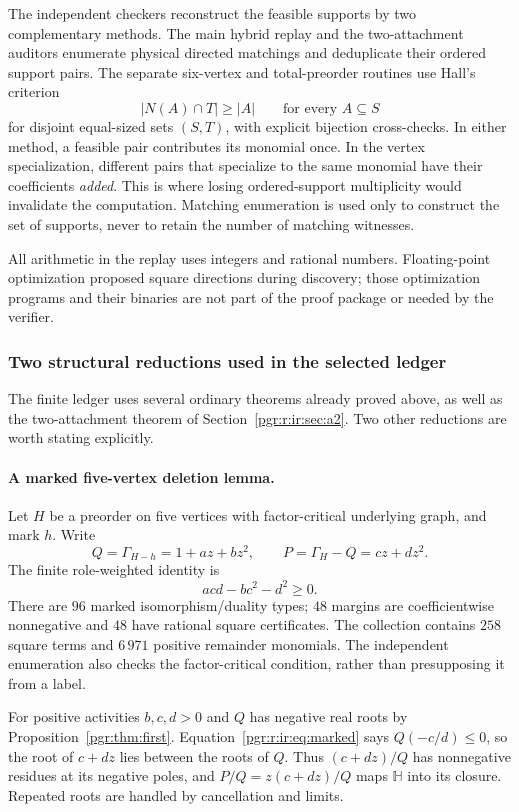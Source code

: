 \documentclass[11pt]{article}
\numberwithin{equation}{section}
\theoremstyle{definition}\newtheorem{definition}[theorem]{Definition}\newtheorem{remark}[theorem]{Remark}
\newcommand{\Ga}{\Gamma}                   %
\newcommand{\HH}{\mathbb H}                %
\begin{document}
The independent checkers reconstruct the feasible supports by two complementary methods. The main hybrid replay and the two-attachment auditors enumerate physical directed matchings and deduplicate their ordered support pairs. The separate six-vertex and total-preorder routines use Hall's criterion
\[
 |N(A)\cap T|\ge |A|\qquad\text{for every }A\subseteq S
\]
for disjoint equal-sized sets $(S,T)$, with explicit bijection cross-checks. In either method, a feasible pair contributes its monomial once. In the vertex specialization, different pairs that specialize to the same monomial have their coefficients \emph{added}. This is where losing ordered-support multiplicity would invalidate the computation. Matching enumeration is used only to construct the set of supports, never to retain the number of matching witnesses.

All arithmetic in the replay uses integers and rational numbers. Floating-point optimization proposed square directions during discovery; those optimization programs and their binaries are not part of the proof package or needed by the verifier.

\subsubsection{Two structural reductions used in the selected ledger}
The finite ledger uses several ordinary theorems already proved above, as well as the two-attachment theorem of Section~\ref{pgr:r:ir:sec:a2}. Two other reductions are worth stating explicitly.

\paragraph{A marked five-vertex deletion lemma.}
Let $H$ be a preorder on five vertices with factor-critical underlying graph, and mark $h$. Write
\[
 Q=\Ga_{H-h}=1+az+bz^2,\qquad
 P=\Ga_H-Q=cz+dz^2.
\]
The finite role-weighted identity is
\begin{equation}\label{pgr:r:ir:eq:marked}
 acd-bc^2-d^2\ge0.
\end{equation}
There are $96$ marked isomorphism/duality types; $48$ margins are coefficientwise nonnegative and $48$ have rational square certificates. The collection contains $258$ square terms and $6\,971$ positive remainder monomials. The independent enumeration also checks the factor-critical condition, rather than presupposing it from a label.

For positive activities $b,c,d>0$ and $Q$ has negative real roots by Proposition~\ref{pgr:thm:first}. Equation~\eqref{pgr:r:ir:eq:marked} says $Q(-c/d)\le0$, so the root of $c+dz$ lies between the roots of $Q$. Thus $(c+dz)/Q$ has nonnegative residues at its negative poles, and $P/Q=z(c+dz)/Q$ maps $\HH$ into its closure. Repeated roots are handled by cancellation and limits.
\end{document}
